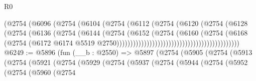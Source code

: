 \begin{lexlean}{R0}
\begin{coremodule}
                                                  (@2754
                                                    (@6096
                                                      (@2754
                                                        (@6104
                                                          (@2754
                                                            (@6112
                                                              (@2754
                                                                (@6120
                                                                  (@2754
                                                                    (@6128
                                                                      (@2754
                                                                        (@6136
                                                                          (@2754
                                                                            (@6144
                                                                              (@2754
                                                                                (@6152
                                                                                  (@2754
                                                                                    (@6160
                                                                                      (@2754
                                                                                        (@6168
                                                                                          (@2754
                                                                                            (@6172
                                                                                              @6174
                                                                                              @5519
                                                                                              @2750)))))))))))))))))))))))))))))))))))))))))))))
@6249 := @5896
    (fun (__b : @2550) =>
    @5897
      (@2754
        (@5905
          (@2754
            (@5913
              (@2754
                (@5921
                  (@2754
                    (@5929
                      (@2754
                        (@5937
                          (@2754
                            (@5944
                              (@2754
                                (@5952
                                  (@2754
                                    (@5960
                                      (@2754

\end{coremodule}
\end{lexlean}

